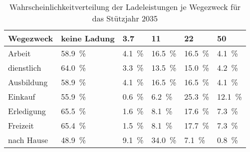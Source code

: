 {
\renewcommand{\arraystretch}{1.2}%
\begin{table}[H]
	\begin{center}
		\caption{Wahrscheinlichkeitverteilung der Ladeleistungen je Wegezweck für das Stützjahr \num{2035}}
		\begin{tabu} to \textwidth {X[1.2] X[1.2, r] X[1, r] X[1, r] X[1, r] X[1, r]}
			\hline
			Wegezweck  & keine Ladung        & \SI{3.7}{\kw}      & \SI{11}{\kw}        & \SI{22}{\kw}        & \SI{50}{\kw}        \\ \hline
			Arbeit     & \SI{58.9}{\percent} & \SI{4.1}{\percent} & \SI{16.5}{\percent} & \SI{16.5}{\percent} & \SI{4.1}{\percent}  \\
			dienstlich & \SI{64.0}{\percent} & \SI{3.3}{\percent} & \SI{13.5}{\percent} & \SI{15.0}{\percent} & \SI{4.2}{\percent}  \\
			Ausbildung & \SI{58.9}{\percent} & \SI{4.1}{\percent} & \SI{16.5}{\percent} & \SI{16.5}{\percent} & \SI{4.1}{\percent}  \\
			Einkauf    & \SI{55.9}{\percent} & \SI{0.6}{\percent} & \SI{6.2}{\percent}  & \SI{25.3}{\percent} & \SI{12.1}{\percent} \\
			Erledigung & \SI{65.5}{\percent} & \SI{1.6}{\percent} & \SI{8.1}{\percent}  & \SI{17.6}{\percent} & \SI{7.3}{\percent}  \\
			Freizeit   & \SI{65.4}{\percent} & \SI{1.5}{\percent} & \SI{8.1}{\percent}  & \SI{17.7}{\percent} & \SI{7.3}{\percent}  \\
			nach Hause & \SI{48.9}{\percent} & \SI{9.1}{\percent} & \SI{34.0}{\percent} & \SI{7.1}{\percent}  & \SI{0.8}{\percent}  \\ \hline
		\end{tabu}
		\label{tab:WegezweckProbability2035}
	\end{center}
	\vspace{-3mm}%
\end{table}
}

